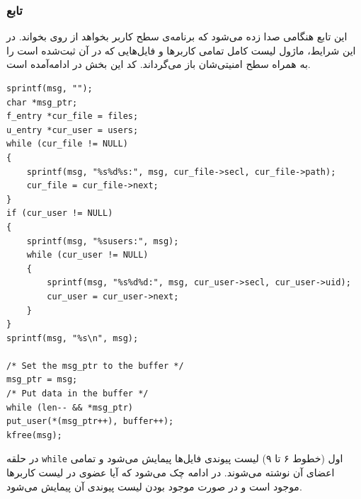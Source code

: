 \documentclass[13pt]{article}
\begin{document}
 \subsubsection{تابع }
 	این تابع هنگامی صدا زده می‌شود که برنامه‌ی سطح کاربر بخواهد از روی 
 	  	بخواند. در این شرایط، ماژول لیست کامل تمامی کاربرها و فایل‌هایی که در آن ثبت‌شده است را به همراه سطح امنیتی‌شان باز می‌گرداند. کد این بخش در ادامه‌آمده است.
 	  	\begin{latin}
 	  		\begin{lstlisting}
sprintf(msg, "");
char *msg_ptr;
f_entry *cur_file = files;
u_entry *cur_user = users;
while (cur_file != NULL)
{
	sprintf(msg, "%s%d%s:", msg, cur_file->secl, cur_file->path);
	cur_file = cur_file->next;
}
if (cur_user != NULL)
{
	sprintf(msg, "%susers:", msg);
	while (cur_user != NULL)
	{
		sprintf(msg, "%s%d%d:", msg, cur_user->secl, cur_user->uid);
		cur_user = cur_user->next;
	}
}
sprintf(msg, "%s\n", msg);

/* Set the msg_ptr to the buffer */
msg_ptr = msg;
/* Put data in the buffer */
while (len-- && *msg_ptr)
put_user(*(msg_ptr++), buffer++);
kfree(msg); 	\end{lstlisting}
 	  	\end{latin}
   	\vspace{-2\baselineskip}
   	در حلقه 
   	\texttt{while}
   	 اول (خطوط ۶ تا ۹) لیست پیوندی فایل‌ها پیمایش می‌شود و تمامی اعضای آن نوشته می‌شوند. در ادامه چک می‌شود که آیا عضوی در لیست کاربرها موجود است و در صورت موجود  بودن لیست پیوندی آن پیمایش می‌شود.
\end{document}

